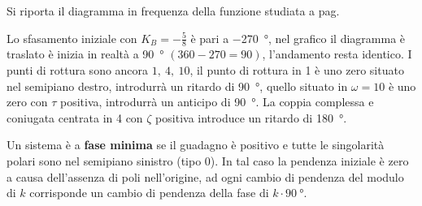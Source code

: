 \newpage
Si riporta il diagramma in frequenza della funzione studiata a pag.
\pageref{sec:Esercizio_bode}
\begin{figure}[h]
\centering
{}
\end{figure}

Lo sfasamento iniziale con $K_B=-\frac{5}{8}$ è pari a \SI{-270}{\degree}, nel
grafico il diagramma è traslato è inizia in realtà a \SI{90}{\degree}
$(360-270=90)$, l'andamento resta identico. I punti di rottura sono ancora $1,\
4,\ 10$, il punto di rottura in 1 è uno zero situato nel semipiano destro,
introdurrà un ritardo di \SI{90}{\degree}, quello situato in $\omega=10$ è uno
zero con $\tau$ positiva, introdurrà un anticipo di \SI{90}{\degree}.
La coppia complessa e coniugata centrata in 4 con $\zeta$ positiva introduce un
ritardo di \SI{180}{\degree}.

Un sistema è a \textbf{fase minima} se il guadagno è positivo e tutte le
singolarità polari sono nel semipiano sinistro (tipo 0).
In tal caso la pendenza iniziale è zero a causa dell'assenza di poli
nell'origine, ad ogni cambio di pendenza del modulo di $k$ corrisponde un
cambio di pendenza della fase di $k\cdot\SI{90}{\degree}$.
